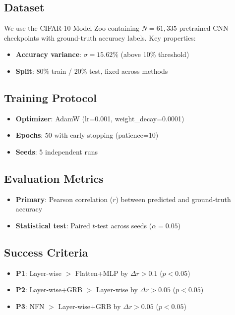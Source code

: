 \subsection{Dataset}

We use the CIFAR-10 Model Zoo containing $N = 61{,}335$ pretrained CNN checkpoints with ground-truth accuracy labels. Key properties:
\begin{itemize}
    \item \textbf{Accuracy variance}: $\sigma = 15.62\%$ (above 10\% threshold)
    \item \textbf{Split}: 80\% train / 20\% test, fixed across methods
\end{itemize}

\subsection{Training Protocol}

\begin{itemize}
    \item \textbf{Optimizer}: AdamW (lr=0.001, weight\_decay=0.0001)
    \item \textbf{Epochs}: 50 with early stopping (patience=10)
    \item \textbf{Seeds}: 5 independent runs
\end{itemize}

\subsection{Evaluation Metrics}

\begin{itemize}
    \item \textbf{Primary}: Pearson correlation ($r$) between predicted and ground-truth accuracy
    \item \textbf{Statistical test}: Paired $t$-test across seeds ($\alpha = 0.05$)
\end{itemize}

\subsection{Success Criteria}

\begin{itemize}
    \item \textbf{P1}: Layer-wise $>$ Flatten+MLP by $\Delta r > 0.1$ ($p < 0.05$)
    \item \textbf{P2}: Layer-wise+GRB $>$ Layer-wise by $\Delta r > 0.05$ ($p < 0.05$)
    \item \textbf{P3}: NFN $>$ Layer-wise+GRB by $\Delta r > 0.05$ ($p < 0.05$)
\end{itemize}

